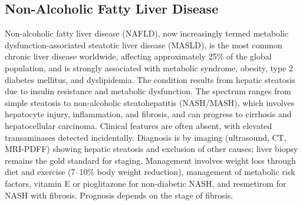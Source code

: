 





\label{sec:Metabolic and Fatty Liver Disease}

\subsection{Non-Alcoholic Fatty Liver Disease}
\label{sec:Non-Alcoholic Fatty Liver Disease}
Non-alcoholic fatty liver disease (NAFLD), now increasingly termed metabolic dysfunction-associated steatotic liver disease (MASLD), is the most common chronic liver disease worldwide, affecting approximately 25\% of the global population, and is strongly associated with metabolic syndrome, obesity, type 2 diabetes mellitus, and dyslipidemia. The condition results from hepatic steatosis due to insulin resistance and metabolic dysfunction. The spectrum ranges from simple steatosis to non-alcoholic steatohepatitis (NASH/MASH), which involves hepatocyte injury, inflammation, and fibrosis, and can progress to cirrhosis and hepatocellular carcinoma. Clinical features are often absent, with elevated transaminases detected incidentally. Diagnosis is by imaging (ultrasound, CT, MRI-PDFF) showing hepatic steatosis and exclusion of other causes; liver biopsy remains the gold standard for staging. Management involves weight loss through diet and exercise (7--10\% body weight reduction), management of metabolic risk factors, vitamin E or pioglitazone for non-diabetic NASH, and resmetirom for NASH with fibrosis. Prognosis depends on the stage of fibrosis.

